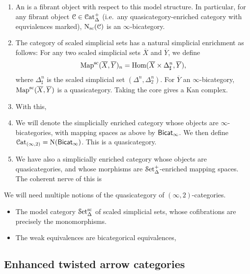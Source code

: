\documentclass[main.tex]{subfiles}
\begin{document}
\begin{enumerate}
  \item An  is a fibrant object with respect to this model structure. In particular, for any fibrant object $\mathcal{C} \in \mathcal{C}\mathrm{at}_{\Delta}^{+}$ (i.e.\ any quasicategory-enriched category with equvialences marked), $\mathrm{N}_{\mathrm{sc}}(\mathcal{C})$ is an $\infty$-bicategory.

  \item The category of scaled simplicial sets has a natural simplicial enrichment as follows: For any two scaled simplicial sets $\overline{X}$ and $\overline{Y}$, we define
    \begin{equation*}
      \mathrm{Map}^{\mathrm{sc}}(\overline{X}, \overline{Y})_{n} = \mathrm{Hom}(\overline{X} \times \Delta^{n}_{\sharp}, \overline{Y}),
    \end{equation*}
    where $\Delta^{n}_{\sharp}$ is the scaled simplicial set $(\Delta^{n}, \Delta^{n}_{2})$. For $\overline{Y}$ an $\infty$-bicategory, $\mathrm{Map}^{\mathrm{sc}}(\overline{X}, \overline{Y})$ is a quasicategory. Taking the core gives a Kan complex.

  \item With this,

  \item We will denote the simplicially enriched category whose objects are $\infty$-bicategories, with mapping spaces as above by $\mathsf{Bicat}_{\infty}$. We then define $\mathcal{C}\mathrm{at}_{(\infty, 2)} = \mathrm{N}(\mathsf{Bicat}_{\infty})$. This is a quasicategory.

  \item We have also a simplicially enriched category whose objects are quasicategories, and whose morphisms are $\mathcal{S}\mathrm{et}_{\Delta}^{+}$-enriched mapping spaces. The coherent nerve of this is
\end{enumerate}

We will need multiple notions of the quasicategory of $(\infty,2)$-categories.
\begin{itemize}
  \item The model category $\mathcal{S}\mathrm{et}_{\Delta}^{\mathrm{sc}}$ of scaled simplicial sets, whose cofibrations are precisely the monomorphisms.

  \item The weak equivalences are bicategorical equivalences,
\end{itemize}

\subsection{Enhanced twisted arrow categories}
\label{ssc:enhanced_twisted_arrow_categories}
\end{document}
